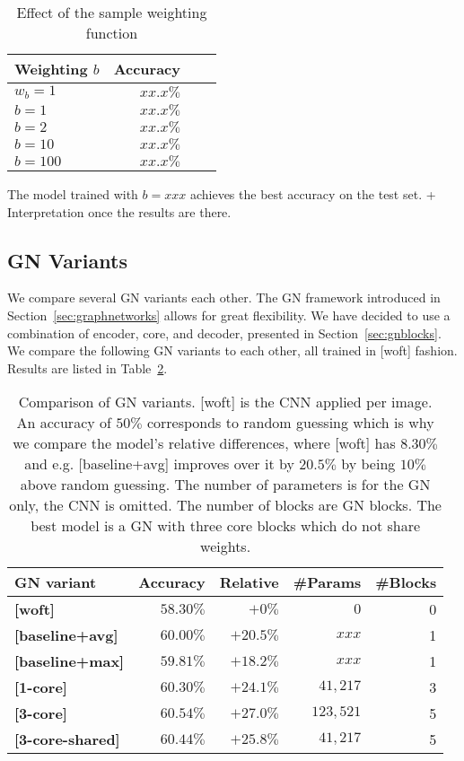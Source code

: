 \begin{table}
    \centering
    \begin{tabular}{lrrr}
        \textbf{Weighting $b$} & \textbf{Accuracy}\\\hline
        $w_b=1$ & $xx.x\%$\\
        $b=1$ & $xx.x\%$\\
        $b=2$ & $xx.x\%$\\
        $b=10$ & $xx.x\%$\\
        $b=100$ & $xx.x\%$\\
    \end{tabular}
    \caption[Effect of the sample weighting function]{Effect of the sample weighting function}
    \label{tab:weightingbase}
\end{table}

The model trained with $b=xxx$ achieves the best accuracy on the test set. + Interpretation once the results are there.

\subsection{GN Variants}

We compare several GN variants each other. The GN framework introduced in Section~\ref{sec:graphnetworks} allows for great flexibility. We have decided to use a combination of encoder, core, and decoder, presented in Section~\ref{sec:gnblocks}.
We compare the following GN variants to each other, all trained in [woft] fashion. Results are listed in Table~\ref{tab:gnvariantscomparison}.

\begin{table}
    \centering
    \begin{tabular}{lrrrr}
        \textbf{GN variant} & \textbf{Accuracy} & \textbf{Relative} & \textbf{\#Params} & \textbf{\#Blocks}\\\hline
        \textbf{[woft]} & $58.30\%$ & $+0\%$ & $0$ & 0 \\
        \textbf{[baseline+avg]} & $60.00\%$ & $+20.5\%$ & $xxx$ & 1\\
        \textbf{[baseline+max]} & $59.81\%$ & $+18.2\%$ & $xxx$ & 1\\
        \textbf{[1-core]} & $60.30\%$ & $+24.1\%$ & $41,217$ & 3\\
        \textbf{[3-core]} & $\bm{60.54\%}$ & $+27.0\%$ & $123,521$ & 5\\
        \textbf{[3-core-shared]} & $60.44\%$ & $+25.8\%$ & $41,217$ & 5\\
    \end{tabular}
    \caption[Comparison of GN variants]{Comparison of GN variants. [woft] is the CNN applied per image. An accuracy of $50\%$ corresponds to random guessing which is why we compare the model's relative differences, where [woft] has $8.30\%$ and e.g. [baseline+avg] improves over it by $20.5\%$ by being $10\%$ above random guessing. The number of parameters is for the GN only, the CNN is omitted. The number of blocks are GN blocks. The best model is a GN with three core blocks which do not share weights.}
    \label{tab:gnvariantscomparison}
\end{table}

